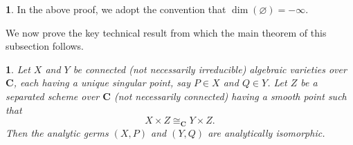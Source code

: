 \documentclass[english,10pt,reqno,twoside]{amsart}
\numberwithin{equation}{section}
\numberwithin{figure}{section}
\theoremstyle{plain}
\newtheorem{thm}{\protect\theoremname}
\theoremstyle{plain}
\theoremstyle{definition}
\newtheorem{rem}{\protect\remarkname}
\providecommand{\theoremname}{Theorem}
\providecommand{\remarkname}{Remark}
\theoremstyle{plain}
\numberwithin{equation}{section}
\newcommand{\C}{\mathbf{C}}
\begin{document}
\begin{rem}
In the above proof, we adopt the convention that $\dim(\varnothing)=-\infty$.
\end{rem}

We now prove the key technical result from which the main theorem of this subsection follows.

\begin{thm}\label{Thm: Our main cancellation theorem}
Let $X$ and $Y$ be connected (not necessarily irreducible) algebraic varieties over $\C$, each having a unique singular point, say $P\in X$ and $Q\in Y$. Let $Z$ be a separated scheme over $\C$ (not necessarily connected) having a smooth point such that
\[
X\times Z \cong_{\C} Y\times Z.
\]
Then the analytic germs $(X,P)$ and $(Y,Q)$ are analytically isomorphic.
\end{thm}
\end{document}
